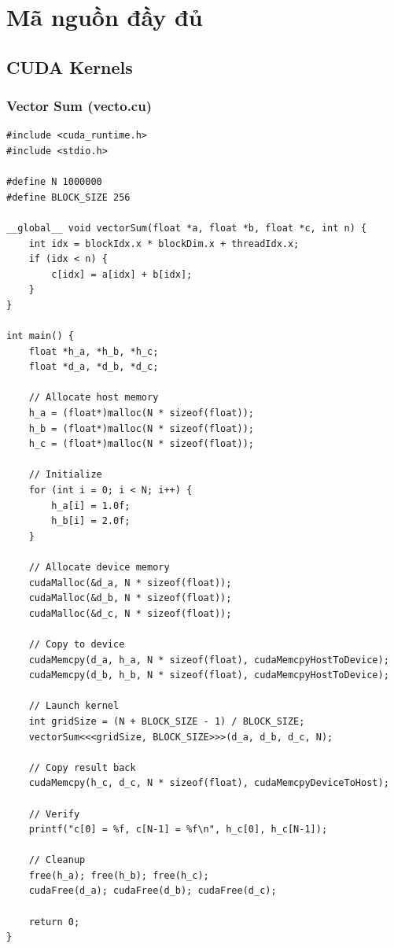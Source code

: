 \appendix
\chapter{Mã nguồn đầy đủ}
\label{chap:appendix}

\section{CUDA Kernels}

\subsection{Vector Sum (vecto.cu)}

\begin{lstlisting}[caption={Vector Sum Kernel hoàn chỉnh}]
#include <cuda_runtime.h>
#include <stdio.h>

#define N 1000000
#define BLOCK_SIZE 256

__global__ void vectorSum(float *a, float *b, float *c, int n) {
    int idx = blockIdx.x * blockDim.x + threadIdx.x;
    if (idx < n) {
        c[idx] = a[idx] + b[idx];
    }
}

int main() {
    float *h_a, *h_b, *h_c;
    float *d_a, *d_b, *d_c;
    
    // Allocate host memory
    h_a = (float*)malloc(N * sizeof(float));
    h_b = (float*)malloc(N * sizeof(float));
    h_c = (float*)malloc(N * sizeof(float));
    
    // Initialize
    for (int i = 0; i < N; i++) {
        h_a[i] = 1.0f;
        h_b[i] = 2.0f;
    }
    
    // Allocate device memory
    cudaMalloc(&d_a, N * sizeof(float));
    cudaMalloc(&d_b, N * sizeof(float));
    cudaMalloc(&d_c, N * sizeof(float));
    
    // Copy to device
    cudaMemcpy(d_a, h_a, N * sizeof(float), cudaMemcpyHostToDevice);
    cudaMemcpy(d_b, h_b, N * sizeof(float), cudaMemcpyHostToDevice);
    
    // Launch kernel
    int gridSize = (N + BLOCK_SIZE - 1) / BLOCK_SIZE;
    vectorSum<<<gridSize, BLOCK_SIZE>>>(d_a, d_b, d_c, N);
    
    // Copy result back
    cudaMemcpy(h_c, d_c, N * sizeof(float), cudaMemcpyDeviceToHost);
    
    // Verify
    printf("c[0] = %f, c[N-1] = %f\n", h_c[0], h_c[N-1]);
    
    // Cleanup
    free(h_a); free(h_b); free(h_c);
    cudaFree(d_a); cudaFree(d_b); cudaFree(d_c);
    
    return 0;
}
\end{lstlisting}

